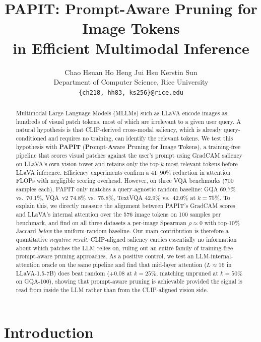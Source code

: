 \documentclass[10pt,twocolumn,letterpaper]{article}
\title{PAPIT: Prompt-Aware Pruning for Image Tokens\\
       in Efficient Multimodal Inference}
\author{%
  Chao Hsuan Ho \quad Heng Jui Hsu \quad Kerstin Sun \\
  Department of Computer Science, Rice University \\
  {\small\texttt{\{ch218, hh83, ks256\}@rice.edu}}
}
\begin{document}
\maketitle

\begin{abstract}
Multimodal Large Language Models (MLLMs) such as LLaVA encode images
as hundreds of visual patch tokens, most of which are irrelevant to a
given user query. A natural hypothesis is that CLIP-derived
cross-modal saliency, which is already query-conditioned and requires
no training, can identify the relevant tokens. We test this
hypothesis with \textbf{PAPIT} (\textbf{P}rompt-\textbf{A}ware
\textbf{P}runing for \textbf{I}mage \textbf{T}okens), a training-free
pipeline that scores visual patches against the user's prompt using
GradCAM saliency on LLaVA's own vision tower and retains only the
top-$k$ most relevant tokens before LLaVA inference. Efficiency
experiments confirm a 41--90\% reduction in attention FLOPs with
negligible scoring overhead. However, on three VQA benchmarks (700
samples each), PAPIT only matches a query-agnostic random baseline:
GQA 69.7\% vs.\ 70.1\%, VQA~v2 74.8\% vs.\ 75.8\%, TextVQA 42.9\% vs.\
42.0\% at $k{=}75\%$. To explain this, we directly measure the
alignment between PAPIT's GradCAM scores and LLaVA's internal
attention over the 576 image tokens on 100 samples per benchmark,
and find on all three datasets a per-image Spearman $\rho \approx 0$
with top-$10\%$ Jaccard \emph{below} the uniform-random baseline. Our main contribution is therefore a
quantitative \emph{negative result}: CLIP-aligned saliency carries
essentially no information about which patches the LLM relies on,
ruling out an entire family of training-free prompt-aware pruning
approaches. As a positive control, we test an LLM-internal-attention
oracle on the same pipeline and find that mid-layer attention
($L\!\approx\!16$ in LLaVA-1.5-7B) does beat random ($+0.08$ at
$k\!=\!25\%$, matching unpruned at $k\!=\!50\%$ on GQA-100), showing
that prompt-aware pruning is achievable provided the signal is read
from inside the LLM rather than from the CLIP-aligned vision side.
\end{abstract}

\section{Introduction}
\end{document}

